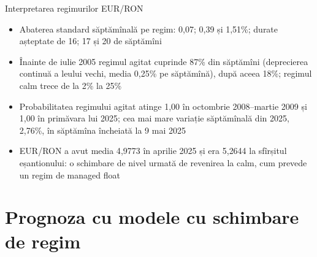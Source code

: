 \begin{frame}{Interpretarea regimurilor EUR/RON}
\itemsize{\small}
\begin{itemize}
    \item Abaterea standard săptămînală pe regim: 0{,}07; 0{,}39 și 1{,}51\%; durate așteptate de 16; 17 și 20 de săptămîni
    \item Înainte de iulie 2005 regimul agitat cuprinde 87\% din săptămîni (deprecierea continuă a leului vechi, media 0{,}25\% pe săptămînă), după aceea 18\%; regimul calm trece de la 2\% la 25\%
    \item Probabilitatea regimului agitat atinge 1{,}00 în octombrie 2008--martie 2009 și 1{,}00 în primăvara lui 2025; cea mai mare variație săptămînală din 2025, 2{,}76\%, în săptămîna încheiată la 9 mai 2025
    \item EUR/RON a avut media 4{,}9773 în aprilie 2025 și era 5{,}2644 la sfîrșitul eșantionului: o schimbare de nivel urmată de revenirea la calm, cum prevede un regim de managed float
\end{itemize}
\end{frame}


\section{Prognoza cu modele cu schimbare de regim}

